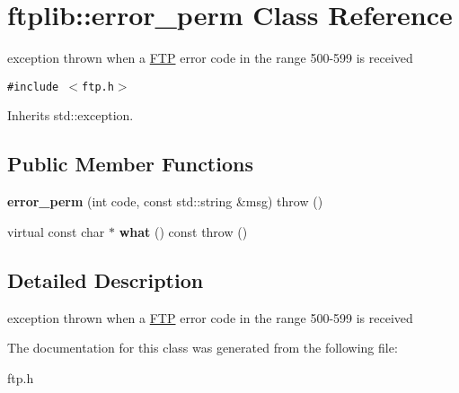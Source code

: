 \hypertarget{classftplib_1_1error__perm}{
\section{ftplib::error\_\-perm Class Reference}
\label{classftplib_1_1error__perm}
}
exception thrown when a \hyperlink{classftplib_1_1FTP}{FTP} error code in the range 500-599 is received  


{\tt \#include $<$ftp.h$>$}

Inherits std::exception.

\subsection*{Public Member Functions}
\begin{CompactItemize}
\item 
\hypertarget{classftplib_1_1error__perm_f39cb3638a78e6967e56d1f7e7346bfb}{
\textbf{error\_\-perm} (int code, const std::string \&msg)  throw ()}
\label{classftplib_1_1error__perm_f39cb3638a78e6967e56d1f7e7346bfb}

\item 
\hypertarget{classftplib_1_1error__perm_402201db39fc4088d7195a13ddce1f23}{
virtual const char $\ast$ \textbf{what} () const   throw ()}
\label{classftplib_1_1error__perm_402201db39fc4088d7195a13ddce1f23}

\end{CompactItemize}


\subsection{Detailed Description}
exception thrown when a \hyperlink{classftplib_1_1FTP}{FTP} error code in the range 500-599 is received 

The documentation for this class was generated from the following file:\begin{CompactItemize}
\item 
ftp.h\end{CompactItemize}
